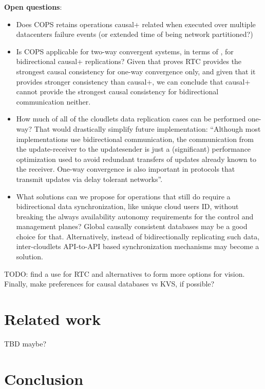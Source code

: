 \documentclass[conference]{IEEEtran}
\begin{document}
\textbf{Open questions}:
\begin{itemize}
  \item Does COPS retains operations causal+ related when executed over
    multiple datacenters failure events (or extended time of being network
    partitioned?)
  \item Is COPS applicable for two-way convergent systems, in terms of
    \cite{b2}, for bidirectional causal+ replications? Given that\cite{b1}
    proves RTC provides the strongest causal consistency for one-way
    convergence only, and given that it provides stronger consistency than
    causal+, we can conclude that causal+ cannot provide the strongest causal
    consistency for bidirectional communication neither.
  \item How much of all of the cloudlets data replication cases can be
    performed one-way? That would drastically simplify future implementation:
    ``Although most implementations use bidirectional communication, the
    communication from the update-receiver to the updatesender is just a
    (significant) performance optimization used to avoid redundant transfers of
    updates already known to the receiver. One-way convergence is also
    important in protocols that transmit updates via delay tolerant
    networks''\cite{b2}.
  \item What solutions can we propose for operations that still do require a
    bidirectional data synchronization, like unique cloud users ID, without
    breaking the always availability autonomy requirements for the control
    and management planes? Global causally consistent databases may be
    a good choice for that. Alternatively, instead of bidirectionally
    replicating such data, inter-cloudlets API-to-API based synchronization
    mechanisms may become a solution.
\end{itemize}

TODO: find a use for RTC and\cite{b6} alternatives to form more
options for vision. Finally, make preferences for causal databases vs KVS, if
possible?

\section{Related work}

TBD maybe?

\section{Conclusion}
\end{document}
